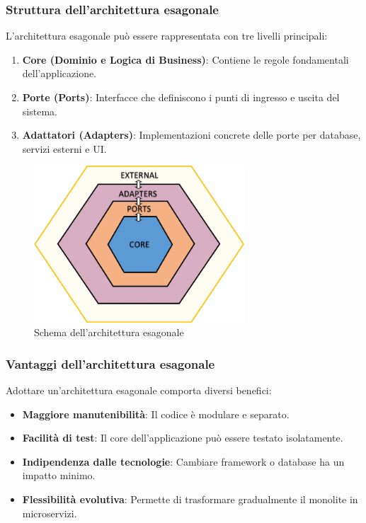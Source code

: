 \subsubsection{Struttura dell’architettura esagonale}
L’architettura esagonale può essere rappresentata con tre livelli principali:
\begin{enumerate}
    \item \textbf{Core (Dominio e Logica di Business)}: Contiene le regole fondamentali dell’applicazione.
    \item \textbf{Porte (Ports)}: Interfacce che definiscono i punti di ingresso e uscita del sistema.
    \item \textbf{Adattatori (Adapters)}: Implementazioni concrete delle porte per database, servizi esterni e UI.
\end{enumerate}
\begin{figure}[H]
    \centering
    \includegraphics[width=0.7\textwidth]{./img/hexagonal_architecture.png}
    \caption{Schema dell'architettura esagonale}
    \label{fig:hex_arch}
\end{figure}

\subsubsection{Vantaggi dell’architettura esagonale}
Adottare un'architettura esagonale comporta diversi benefici:
\begin{itemize}
    \item \textbf{Maggiore manutenibilità}: Il codice è modulare e separato.
    \item \textbf{Facilità di test}: Il core dell’applicazione può essere testato isolatamente.
    \item \textbf{Indipendenza dalle tecnologie}: Cambiare framework o database ha un impatto minimo.
    \item \textbf{Flessibilità evolutiva}: Permette di trasformare gradualmente il monolite in microservizi.
\end{itemize}

